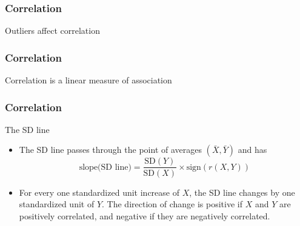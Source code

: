 \documentclass[handout]{beamer}
\begin{document}


   \begin{frame}
   \frametitle{Correlation}
   \begin{center}
   \end{center}
   Outliers affect correlation
   \end{frame}



   \begin{frame}
   \frametitle{Correlation}
   \begin{center}
   \end{center}
   Correlation is a linear measure of association
   \end{frame}


   \begin{frame} \frametitle{Correlation}

   \begin{block}
   {The SD line}
   \begin{itemize}

   \item The SD line passes through the point of averages $(\bar{X}, \bar{Y})$
   and has
   $$
   \text{slope(SD line)} = \frac{\text{SD}(Y)}{\text{SD}(X)} \times \text{sign}(r(X,Y))
   $$


   \item For every one standardized unit increase of $X$, the SD line
   changes by one standardized unit of $Y$.  The direction of change is positive
   if $X$ and $Y$ are positively correlated, and negative
   if they are negatively correlated.

   \end{itemize}
   \end{block}
   \end{frame}
\end{document}
